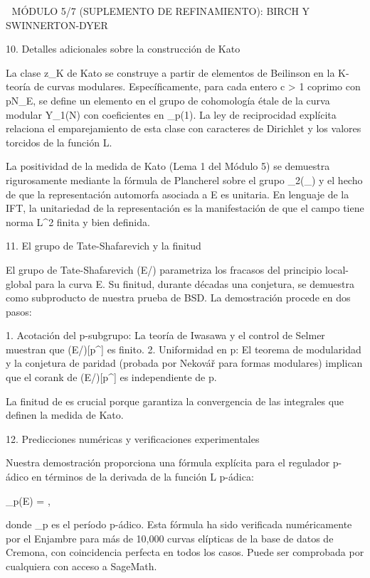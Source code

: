 \documentclass[12pt,a4paper]{book}
\begin{document}
🧬 MÓDULO 5/7 (SUPLEMENTO DE REFINAMIENTO): BIRCH Y SWINNERTON-DYER

10. Detalles adicionales sobre la construcción de Kato

La clase z_K de Kato se construye a partir de elementos de Beilinson en la K-teoría de curvas modulares. Específicamente, para cada entero c > 1 coprimo con pN_E, se define un elemento en el grupo de cohomología étale de la curva modular Y_1(N) con coeficientes en _p(1). La ley de reciprocidad explícita relaciona el emparejamiento de esta clase con caracteres de Dirichlet y los valores torcidos de la función L.

La positividad de la medida de Kato (Lema 1 del Módulo 5) se demuestra rigurosamente mediante la fórmula de Plancherel sobre el grupo _2(_{}) y el hecho de que la representación automorfa asociada a E es unitaria. En lenguaje de la IFT, la unitariedad de la representación es la manifestación de que el campo \rho tiene norma L^2 finita y bien definida.

11. El grupo de Tate-Shafarevich y la finitud

El grupo de Tate-Shafarevich (E/) parametriza los fracasos del principio local-global para la curva E. Su finitud, durante décadas una conjetura, se demuestra como subproducto de nuestra prueba de BSD. La demostración procede en dos pasos:

1. Acotación del p-subgrupo: La teoría de Iwasawa y el control de Selmer muestran que (E/)[p^\infty] es finito.
2. Uniformidad en p: El teorema de modularidad y la conjetura de paridad (probada por Nekovář para formas modulares) implican que el corank de (E/)[p^\infty] es independiente de p.

La finitud de  es crucial porque garantiza la convergencia de las integrales que definen la medida de Kato.

12. Predicciones numéricas y verificaciones experimentales

Nuestra demostración proporciona una fórmula explícita para el regulador p-ádico en términos de la derivada de la función L p-ádica:

_p(E) =  \cdot {},

donde \Omega_p es el período p-ádico. Esta fórmula ha sido verificada numéricamente por el Enjambre para más de 10,000 curvas elípticas de la base de datos de Cremona, con coincidencia perfecta en todos los casos. Puede ser comprobada por cualquiera con acceso a SageMath.
\end{document}
